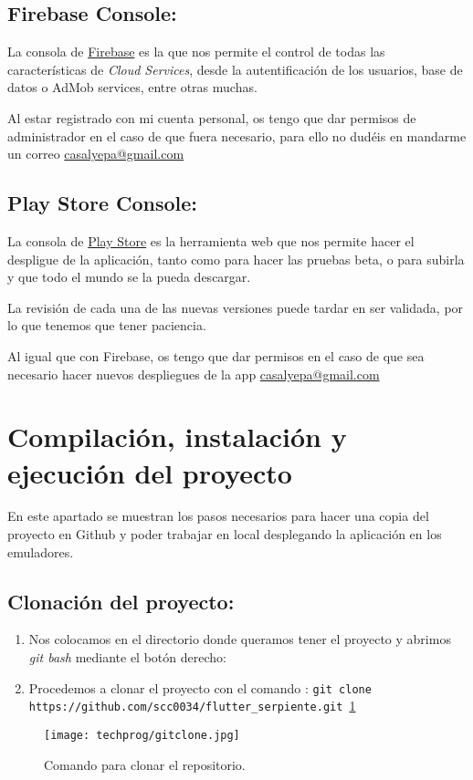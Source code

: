 \subsection{Firebase Console:}
La consola de \href{https://console.firebase.google.com/?hl=es}{Firebase} es la que nos permite el control de todas las características de \emph{Cloud Services}, desde la autentificación de los usuarios, base de datos o AdMob services, entre otras muchas.

Al estar registrado con mi cuenta personal, os tengo que dar permisos de administrador en el caso de que fuera necesario, para ello no dudéis en mandarme un correo \href{mailto:casalyepa@gmail.com}{casalyepa@gmail.com}


\subsection{Play Store Console:}
La consola de \href{https://play.google.com/apps/publish/?account=9184458375980004308#AppListPlace}{Play Store} es la herramienta web que nos permite hacer el despligue de la aplicación, tanto como para hacer las pruebas beta, o para subirla y que todo el mundo se la pueda descargar.

La revisión de cada una de las nuevas versiones puede tardar en ser validada, por lo que tenemos que tener paciencia.

Al igual que con Firebase, os tengo que dar permisos en el caso de que sea necesario hacer nuevos despliegues de la app \href{mailto:casalyepa@gmail.com}{casalyepa@gmail.com}


\section{Compilación, instalación y ejecución del proyecto}
En este apartado se muestran los pasos necesarios para hacer una copia del proyecto en Github y poder trabajar en local desplegando la aplicación en los emuladores.

\subsection{Clonación del proyecto:}
\begin{enumerate}
	\item Nos colocamos en el directorio donde queramos tener el proyecto y abrimos \emph{git bash} mediante el botón derecho:
	\item Procedemos a clonar el proyecto con el comando : 
	\texttt{git clone \\https://github.com/scc0034/flutter\_serpiente.git}~\ref{fig:git-clone}
\end{enumerate}
\begin{figure}[H]
	\centering
	\texttt{[image: techprog/gitclone.jpg]}
	\caption{Comando para clonar el repositorio.}\label{fig:git-clone}
\end{figure}
